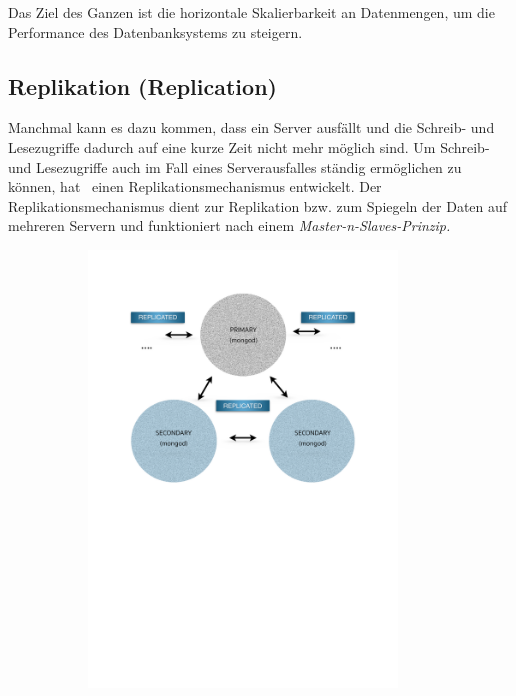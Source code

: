 Das Ziel des Ganzen ist die horizontale Skalierbarkeit an Datenmengen, um die Performance des Datenbanksystems zu steigern.
\subsection{Replikation (Replication)}\label{replication}
Manchmal kann es dazu kommen, dass ein Server ausfällt und die Schreib- und Lesezugriffe dadurch auf eine kurze Zeit nicht mehr möglich sind. Um Schreib- und Lesezugriffe auch im Fall eines Serverausfalles ständig ermöglichen zu können, hat \mongo\ einen Replikationsmechanismus entwickelt. Der Replikationsmechanismus dient zur Replikation bzw. zum Spiegeln der Daten auf mehreren Servern und funktioniert nach einem \textit{Master-n-Slaves-Prinzip.}
\begin{figure}[H]
   \begin{subfigure}[t]{0.49\textwidth}\vspace{0pt}
   \centering
      \includegraphics[trim = 28mm 139mm 28mm 29mm, clip, width=0.9\textwidth]{resources/replicaSet/createReplicaSet2}

\end{subfigure}
\end{figure}

